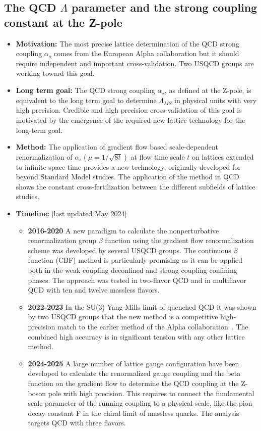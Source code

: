 \documentclass[12pt,hyperpdf]{article}
\begin{document}
\subsection{The QCD $\Lambda$ parameter and the  strong coupling constant at the Z-pole}
\begin{itemize}
	\item{\bf Motivation:}  The most precise lattice determination of
          the QCD strong coupling $\alpha_s$  comes from the European
          Alpha collaboration but  it should require independent and
          important  cross-validation. Two  USQCD  groups are working
          toward  this goal. 
	\item{\bf Long term goal:} The QCD strong coupling $\alpha_s$, as
          defined at the Z-pole, is equivalent to the long term goal
          to determine $\Lambda_{\overline{MS}}$  in physical units
          with very high precision. Credible and high precision
          cross-validation  of this goal  is motivated by the
          emergence of  the required new lattice  technology for the
          long-term goal. 
	\item{\bf Method:}  The application of gradient flow based
          scale-dependent renormalization of
          $\alpha_s(\mu=1/\sqrt{8t})$ at flow time scale $t$ on
          lattices extended to  infinite space-time provides a new
          technology, originally developed for beyond Standard Model studies. The application of the method in QCD shows the constant cross-fertilization  between the different subfields  of lattice studies. 
\item{\bf Timeline:} \hfill [last updated May 2024]
\begin{itemize}
\item{\bf 2016-2020} A new paradigm to calculate the nonperturbative renormalization group $\beta$ function using the gradient flow renormalization scheme was developed by several USQCD groups. The continuous $\beta$ function (CBF) method is particularly promising as it can be applied both in the weak coupling deconfined and strong coupling confining phases. The approach was tested in two-flavor QCD and in multiflavor QCD with ten and twelve massless flavors.
\item{\bf 2022-2023} In the {\rm SU}(3) Yang-Mills limit of quenched
  QCD it was shown by two USQCD groups that the new method is a
  competitive high-precision match to the earlier method of the Alpha
  collaboration~\cite{Hasenfratz:2023bok,Wong:2023jvr}. The combined
  high accuracy is in significant tension with any other lattice
  method.
\item{\bf 2024-2025} A large number of  lattice gauge configuration have been developed to calculate the renormalized gauge coupling and the beta function on the gradient flow to determine the QCD coupling at the Z-boson pole with high precision. This requires to connect the fundamental scale parameter of the running coupling to a physical scale, like the pion decay constant F in the chiral limit of massless quarks. The analysis targets QCD with three flavors.          
\end{itemize}
\end{itemize}
\end{document}
